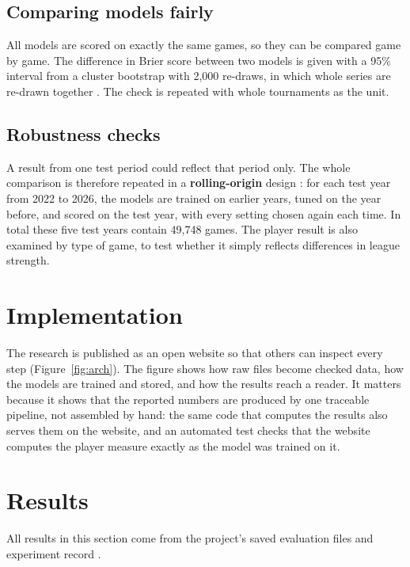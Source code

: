 \documentclass[12pt,a4paper]{article}
\begin{document}
\subsection{Comparing models fairly}

All models are scored on exactly the same games, so they can be compared game by game. The difference in Brier score between two models is given with a 95\% interval from a cluster bootstrap with 2,000 re-draws, in which whole series are re-drawn together \citep{cameron2008,efron1979}. The check is repeated with whole tournaments as the unit.

\subsection{Robustness checks}

A result from one test period could reflect that period only. The whole comparison is therefore repeated in a \textbf{rolling-origin} design \citep{tashman2000}: for each test year from 2022 to 2026, the models are trained on earlier years, tuned on the year before, and scored on the test year, with every setting chosen again each time. In total these five test years contain 49,748 games. The player result is also examined by type of game, to test whether it simply reflects differences in league strength.

\section{Implementation}

The research is published as an open website so that others can inspect every step (Figure~\ref{fig:arch}). The figure shows how raw files become checked data, how the models are trained and stored, and how the results reach a reader. It matters because it shows that the reported numbers are produced by one traceable pipeline, not assembled by hand: the same code that computes the results also serves them on the website, and an automated test checks that the website computes the player measure exactly as the model was trained on it.



\section{Results}\label{sec:results}

All results in this section come from the project's saved evaluation files and experiment record \citep{ei2026}.
\end{document}
